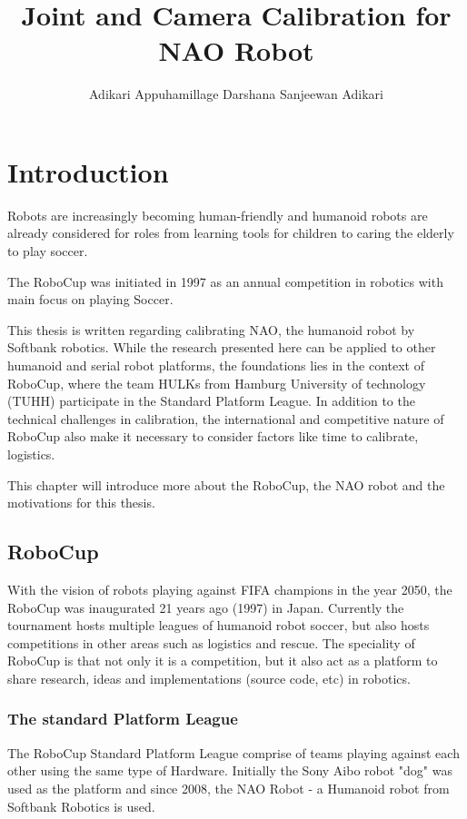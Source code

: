 \documentclass[english, printversion, nomenclature, notitle]{tuvisionthesis} %
\author{Adikari Appuhamillage Darshana Sanjeewan Adikari}
\title{Joint and Camera Calibration for NAO Robot}
\begin{document}
\hypersetup{
	pdfauthor=\@author\relax,
	pdftitle=\@title\relax
}
\tuvisionheading
\hypersetup{pageanchor=true}
\clearpage{\thispagestyle{empty}\cleardoublepage}

\chapter{Introduction}
Robots are increasingly becoming human-friendly and humanoid robots are already considered for roles from learning tools for children to caring the elderly to play soccer.

The RoboCup was initiated in 1997 as an annual competition in robotics with main focus on playing Soccer.

This thesis is written regarding calibrating NAO, the humanoid robot by Softbank robotics. While the research presented here can be applied to other humanoid and serial robot platforms, the foundations lies in the context of RoboCup, where the team HULKs from Hamburg University of technology (TUHH) participate in the Standard Platform League. In addition to the technical challenges in calibration, the international and competitive nature of RoboCup also make it necessary to consider factors like time to calibrate, logistics. 

This chapter will introduce more about the RoboCup, the NAO robot and the motivations for this thesis.

\section{RoboCup}

With the vision of robots playing against FIFA champions in the year 2050, the RoboCup was inaugurated 21 years ago (1997) in Japan. Currently the tournament hosts multiple leagues of humanoid robot soccer, but also hosts competitions in other areas such as logistics and rescue. The speciality of RoboCup is that not only it is a competition, but it also act as a platform to share research, ideas and implementations (source code, etc) in robotics.

\subsection{The standard Platform League}

The RoboCup Standard Platform League comprise of teams playing against each other using the same type of Hardware. Initially the Sony Aibo robot "dog" was used as the platform and since 2008, the NAO Robot - a Humanoid robot from Softbank Robotics is used. 
\end{document}
